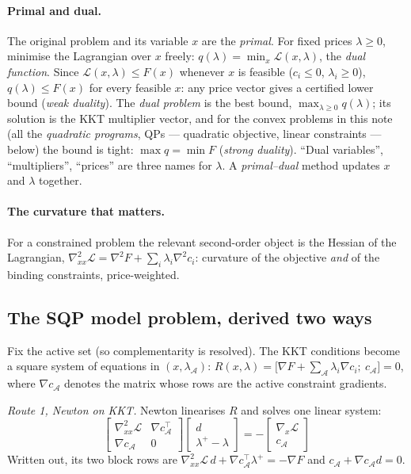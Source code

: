\documentclass[11pt,a4paper]{article}
\newcommand{\T}{^{\!\top}}
\newcommand{\rev}[1]{#1}
\begin{document}
\paragraph{Primal and dual.}  The original problem and its variable $x$ are the
\emph{primal}.  For fixed prices $\lambda\ge0$, minimise the Lagrangian over $x$ freely:
$q(\lambda)=\min_x\mathcal L(x,\lambda)$, the \emph{dual function}.  Since
$\mathcal L(x,\lambda)\le F(x)$ whenever $x$ is feasible ($c_i\le0$, $\lambda_i\ge0$),
$q(\lambda)\le F(x)$ for every feasible $x$: any price vector gives a certified lower
bound (\emph{weak duality}).  The \emph{dual problem} is the best bound,
$\max_{\lambda\ge0}q(\lambda)$; its solution is the KKT multiplier vector, and for the
convex problems in this note (\rev{all the \emph{quadratic programs}, QPs --- quadratic
objective, linear constraints --- below}) the bound is tight: $\max q=\min F$
(\emph{strong duality}).  ``Dual variables'', ``multipliers'', ``prices'' are three names
for $\lambda$.  A \emph{primal--dual} method updates $x$ and $\lambda$ together.

\paragraph{The curvature that matters.}  For a constrained problem the relevant
second-order object is the Hessian of the Lagrangian,
$\nabla^2_{xx}\mathcal L=\nabla^2F+\sum_i\lambda_i\nabla^2c_i$: curvature of the
objective \emph{and} of the binding constraints, price-weighted.

\subsection{The SQP model problem, derived two ways}
\label{sec:sqp-derive}
Fix the active set (so complementarity is resolved).  The KKT conditions become a square
system of equations in $(x,\lambda_{\mathcal A})$:
$R(x,\lambda)=\bigl[\nabla F+\sum_{\mathcal A}\lambda_i\nabla c_i;\ c_{\mathcal A}\bigr]=0$,
where $\nabla c_{\mathcal A}$ denotes the matrix whose rows are the active constraint
gradients.

\emph{Route 1, Newton on KKT.}  Newton linearises $R$ and solves one linear system:
\[
\boxed{\;
\begin{bmatrix}\nabla^2_{xx}\mathcal L & \nabla c_{\mathcal A}\T\\ \nabla c_{\mathcal A} & 0\end{bmatrix}
\begin{bmatrix}d\\ \lambda^{+}-\lambda\end{bmatrix}
=-\begin{bmatrix}\nabla_x\mathcal L\\ c_{\mathcal A}\end{bmatrix}
\;}
\]
Written out, its two block rows are
$\nabla^2_{xx}\mathcal L\,d+\nabla c_{\mathcal A}\T\lambda^{+}=-\nabla F$ and
$c_{\mathcal A}+\nabla c_{\mathcal A}d=0$.
\end{document}
